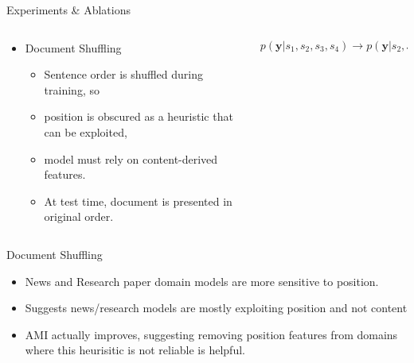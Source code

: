 \begin{frame}{Experiments \& Ablations}
\begin{columns}
    \begin{column}{0.5\textwidth}
\begin{itemize}
    \item Document Shuffling
        \begin{itemize}
            \item Sentence order is shuffled during training, so
                \vspace{5pt}
            \item position is obscured as a heuristic that can be exploited,
                \vspace{5pt}
             \item model must rely on content-derived features.
                \vspace{5pt}
             \item At test time, document is presented in original order.
        \end{itemize}
\end{itemize}
\end{column}
\begin{column}{0.5\textwidth}
    \[ p(\mathbf{y}|s_1, s_2, s_3, s_4) \rightarrow p(\mathbf{y}|s_2, s_4, s_1,s_3)   \]
\end{column}
\end{columns}
\end{frame}

\begin{frame}{Document Shuffling}


\begin{itemize}
    \item<2-> News and Research paper domain models are more sensitive to
position.
\item <3->Suggests news/research models are mostly exploiting position and not content
\item<4-> \alert<4>{AMI actually improves,} suggesting removing position features from
    domains where this heurisitic is not reliable is helpful.
\end{itemize}

\end{frame}
